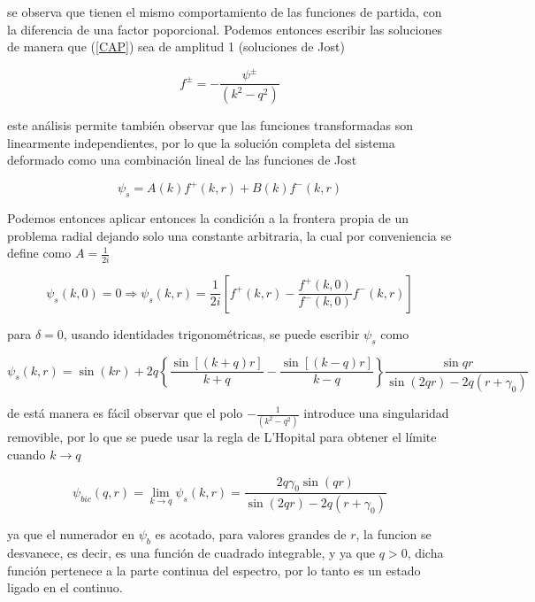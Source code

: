 se observa que tienen el mismo comportamiento de las funciones de partida, con la diferencia de una factor poporcional. Podemos entonces escribir las soluciones de manera que (\ref{CAP}) sea de amplitud 1 (soluciones de Jost)

\begin{equation*}
f^{\pm} = -\frac{\psi^{\pm}}
{(k^2 - q^2)}
\end{equation*}

este análisis permite también observar que las funciones transformadas son linearmente independientes, por lo que la solución completa del sistema deformado como una combinación lineal de las funciones de Jost

\begin{equation}
\psi_s =A(k) f^{+}(k,r) + B(k) f^{-}(k,r) \label{CLSJ}
\end{equation}

Podemos entonces aplicar entonces la condición a la frontera propia de un problema radial dejando solo una constante arbitraria, la cual por conveniencia se define como $A=\frac{1}{2i}$

\begin{equation*}
\psi_s(k,0) = 0 \Longrightarrow \psi_s (k,r) = \frac{1}{2i} \left[f^{+}(k,r) - \frac{f^{+}(k,0)}{f^{-}(k,0)} f^{-}(k,r)\right]
\end{equation*}

para $\delta = 0$, usando identidades trigonométricas, se puede escribir $\psi_s$ como

\begin{equation*}
\psi_s(k,r) = \sin(kr) + 2 q \left\{ \frac{\sin[(k+q)r]}{k+q} - \frac{\sin[(k-q)r]}{k-q} \right\} \frac{\sin{qr}}{\sin(2qr) - 2q(r + \gamma_0)}
\end{equation*}

de está manera es fácil observar que el polo $-\frac{1}{(k^2 - q^2)}$ introduce una singularidad removible, por lo que se puede usar la regla de L'Hopital para obtener el límite cuando $k \to q$

\begin{equation*}
\psi_{bic}(q,r)=\lim_{k \to q}\psi_s(k,r) =  \frac{2 q \gamma_0 \sin(qr)}{\sin(2 qr) - 2q(r + \gamma_0)}
\end{equation*}

ya que el numerador en $\psi_b$ es acotado, para valores grandes de $r$, la funcion se desvanece, es decir, es una función de cuadrado integrable, y ya que $q > 0$, dicha función pertenece a la parte continua del espectro, por lo tanto es un estado ligado en el continuo.


